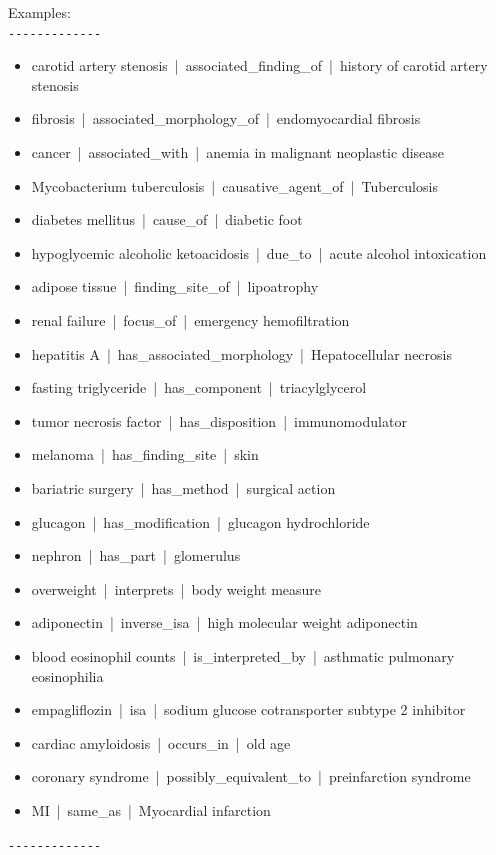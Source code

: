 \documentclass[10pt]{article}
\begin{document}
\begin{appendices}
\begin{tcolorbox}
Examples:  \\
\verb|-------------| 
\begin{itemize}
  \item carotid artery stenosis \,|\, associated\_finding\_of \,|\, history of carotid artery stenosis
  \item fibrosis \,|\, associated\_morphology\_of \,|\, endomyocardial fibrosis
  \item cancer \,|\, associated\_with \,|\, anemia in malignant neoplastic disease
  \item Mycobacterium tuberculosis \,|\, causative\_agent\_of \,|\, Tuberculosis
  \item diabetes mellitus \,|\, cause\_of \,|\, diabetic foot
  \item hypoglycemic alcoholic ketoacidosis \,|\, due\_to \,|\, acute alcohol intoxication
  \item adipose tissue \,|\, finding\_site\_of \,|\, lipoatrophy
  \item renal failure \,|\, focus\_of \,|\, emergency hemofiltration
  \item hepatitis A \,|\, has\_associated\_morphology \,|\, Hepatocellular necrosis
  \item fasting triglyceride \,|\, has\_component \,|\, triacylglycerol
  \item tumor necrosis factor \,|\, has\_disposition \,|\, immunomodulator
  \item melanoma \,|\, has\_finding\_site \,|\, skin
  \item bariatric surgery \,|\, has\_method \,|\, surgical action
  \item glucagon \,|\, has\_modification \,|\, glucagon hydrochloride
  \item nephron \,|\, has\_part \,|\, glomerulus
  \item overweight \,|\, interprets \,|\, body weight measure
  \item adiponectin \,|\, inverse\_isa \,|\, high molecular weight adiponectin
  \item blood eosinophil counts \,|\, is\_interpreted\_by \,|\, asthmatic pulmonary eosinophilia
  \item empagliflozin \,|\, isa \,|\, sodium glucose cotransporter subtype 2 inhibitor
  \item cardiac amyloidosis \,|\, occurs\_in \,|\, old age
  \item coronary syndrome \,|\, possibly\_equivalent\_to \,|\, preinfarction syndrome
  \item MI \,|\, same\_as \,|\, Myocardial infarction
\end{itemize}
\verb|-------------| \\ 


\end{tcolorbox}
\end{appendices}
\end{document}
